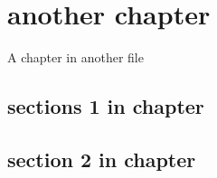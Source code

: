 \chapter{another chapter}
A chapter in another file
\section{sections 1 in chapter}
\section{section 2 in chapter}